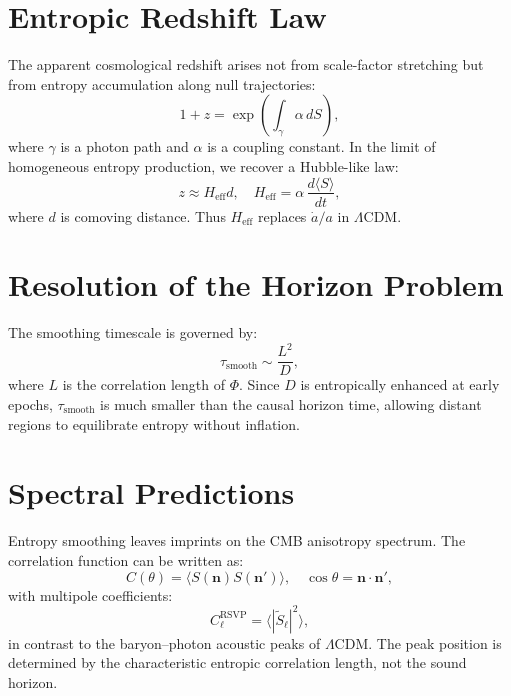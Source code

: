 \documentclass[12pt]{report}
\begin{document}
\section{Entropic Redshift Law}
The apparent cosmological redshift arises not from scale-factor stretching but from entropy accumulation along null trajectories:
\begin{equation}
1+z = \exp\left(\int_\gamma \alpha \, dS \right), \label{eq:entropic-redshift}
\end{equation}
where \(\gamma\) is a photon path and \(\alpha\) is a coupling constant. In the limit of homogeneous entropy production, we recover a Hubble-like law:
\begin{equation}
z \approx H_{\text{eff}} d, \quad H_{\text{eff}} = \alpha \, \frac{d\langle S \rangle}{dt},
\end{equation}
where \(d\) is comoving distance. Thus \(H_{\text{eff}}\) replaces \(\dot{a}/a\) in \(\Lambda\)CDM.

\section{Resolution of the Horizon Problem}
The smoothing timescale is governed by:
\begin{equation}
\tau_{\text{smooth}} \sim \frac{L^2}{D},
\end{equation}
where \(L\) is the correlation length of \(\Phi\). Since \(D\) is entropically enhanced at early epochs, \(\tau_{\text{smooth}}\) is much smaller than the causal horizon time, allowing distant regions to equilibrate entropy without inflation.

\section{Spectral Predictions}
Entropy smoothing leaves imprints on the CMB anisotropy spectrum. The correlation function can be written as:
\begin{equation}
C(\theta) = \langle S(\mathbf{n}) S(\mathbf{n}') \rangle, \quad \cos \theta = \mathbf{n}\cdot \mathbf{n}',
\end{equation}
with multipole coefficients:
\begin{equation}
C_\ell^{\text{RSVP}} = \langle |\tilde{S}_\ell|^2 \rangle, \label{eq:spectrum}
\end{equation}
in contrast to the baryon–photon acoustic peaks of \(\Lambda\)CDM. The peak position is determined by the characteristic entropic correlation length, not the sound horizon.
\end{document}
